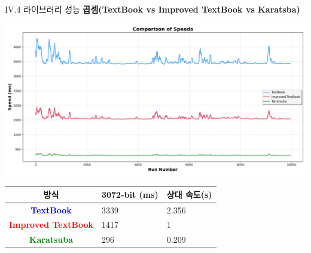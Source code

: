 \documentclass{beamer}
\begin{document}
\begin{frame}{IV.4 라이브러리 성능}
	\alert{\bf 곱셈(TextBook vs Improved TextBook vs Karatsba)}\\
	\begin{center}
		\includegraphics[width=\linewidth,height=.525\textheight]{mul_3072.png}
	\end{center}
	\begin{center}
		\begin{tabularx}{\textwidth}{c||XX}
			\hline
			방식 & 3072-bit (ms) & 상대 속도(s)\\
			\midrule
			\textcolor{blue}{\bf TextBook} & 3339 & 2.356 \\
			\textcolor{red}{\bf Improved TextBook} & 1417 & 1\\
			\textcolor{green}{\bf Karatsuba} & 296 & 0.209\\
			\hline
		\end{tabularx}
	\end{center}
\end{frame}
\end{document}
